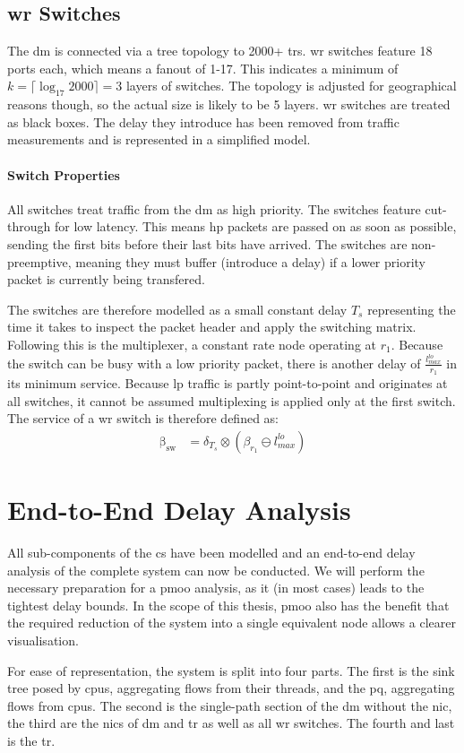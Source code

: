 \subsection{\gls{wr} Switches}

The \gls{dm} is connected via a tree topology to 2000+ \gls{tr}s. \gls{wr} switches feature 18 ports each, which means a fanout of 1-17.
This indicates a minimum of $k = \lceil \log_{17} 2000 \rceil = 3$ layers of switches. The topology is adjusted for geographical reasons though, so the actual size is likely to be 5 layers.
\gls{wr} switches are treated as black boxes. The delay they introduce has been removed from traffic measurements and is represented in a simplified model.

\paragraph{Switch Properties}
All switches treat traffic from the \gls{dm} as high priority. The switches feature cut-through for low latency. This means \gls{hp} packets are passed on as soon as possible,
sending the first bits before their last bits have arrived. The switches are non-preemptive, meaning they must buffer (introduce a delay) if a lower priority packet is currently being transfered.
\par
The switches are therefore modelled as a small constant delay $T_s$ representing the time it takes to inspect the packet header and apply the switching matrix.
Following this is the multiplexer, a constant rate node operating at $r_1$. Because the switch can be busy with a low priority packet, there is another delay of $\frac{l^{lo}_{max}}{r_1}$
in its minimum service. Because \gls{lp} traffic is partly point-to-point and originates at all switches, it cannot be assumed multiplexing is applied only at the first switch.
The service of a \gls{wr} switch is therefore defined as:
%
\begin{equation}
\begin{aligned}
\mathrm{\beta_{sw}} &=  \delta_{T_s} \otimes (\beta_{r_1} \ominus l^{lo}_{max})
\label{eq:wr-sw}
\end{aligned}
\end{equation}
%
\section{End-to-End Delay Analysis}
\label{sec:e2e_da}
All sub-components of the  \gls{cs} have been modelled and an end-to-end delay analysis of the complete system can now be conducted.
We will perform the necessary preparation for a \gls{pmoo} analysis, as it (in most cases) leads to the tightest delay bounds.
In the scope of this thesis, \gls{pmoo} also has the benefit that the required reduction of the system into a single equivalent node allows a clearer visualisation.
\par
For ease of representation, the system is split into four parts. The first is the sink tree posed by \gls{cpu}s, aggregating flows from their threads,
and the \gls{pq}, aggregating flows from \gls{cpu}s. The second is the single-path section of the \gls{dm} without the \gls{nic}, the third are the \gls{nic}s of \gls{dm} and \gls{tr}
as well as all \gls{wr} switches. The fourth and last is the \gls{tr}.
